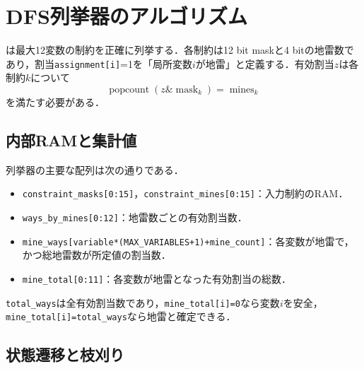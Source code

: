 \section{DFS列挙器のアルゴリズム}
\label{sec:enumerator-algorithm}

は最大12変数の制約を正確に列挙する．各制約は12 bit maskと4 bitの地雷数であり，割当\texttt{assignment[i]}=1を「局所変数$i$が地雷」と定義する．有効割当$z$は各制約$k$について
\begin{equation}
  \operatorname{popcount}(z\mathbin{\&}\operatorname{mask}_k)=\operatorname{mines}_k
  \label{eq:enumerator-constraint}
\end{equation}
を満たす必要がある．

\subsection{内部RAMと集計値}

列挙器の主要な配列は次の通りである．
\begin{itemize}
  \item \texttt{constraint\_masks[0:15]}，\texttt{constraint\_mines[0:15]}：入力制約のRAM．
  \item \texttt{ways\_by\_mines[0:12]}：地雷数ごとの有効割当数．
  \item \texttt{mine\_ways[variable*(MAX\_VARIABLES+1)+mine\_count]}：各変数が地雷で，かつ総地雷数が所定値の割当数．
  \item \texttt{mine\_total[0:11]}：各変数が地雷となった有効割当の総数．
\end{itemize}
\texttt{total\_ways}は全有効割当数であり，\texttt{mine\_total[i]=0}なら変数$i$を安全，\texttt{mine\_total[i]=total\_ways}なら地雷と確定できる．

\subsection{状態遷移と枝刈り}

